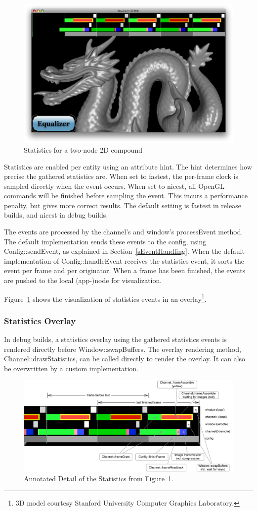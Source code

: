 \documentclass[10pt,a4]{scrartcl}
\newcommand{\fig}[1]{Figure~\ref{#1}}
\newcommand{\sref}[1]{Section~\ref{#1}}
\begin{document}
\begin{figure}
  \includegraphics[width=.382\textwidth]{images/statistics.png}
  {\caption{\small\label{fStatistics}Statistics for a two-node 2D compound}}
\end{figure}
Statistics are enabled per entity using an attribute hint. The hint
determines how precise the gathered statistics are. When set to
\textsf{fastest}, the per-frame clock is sampled directly when the event
occurs. When set to \textsf{nicest}, all OpenGL commands will be
finished before sampling the event. This incurs a performance penalty,
but gives more correct results. The default setting is fastest in
release builds, and nicest in debug builds.

The events are processed by the channel's and window's
\textsf{processEvent} method. The default implementation sends these
events to the config, using \textsf{Config::sendEvent}, as explained in
\sref{sEventHandling}. When the default implementation of
\textsf{Config::handleEvent} receives the statistics event, it sorts the
event per frame and per originator. When a frame has been finished, the
events are pushed to the local (app-)node for visualization.

\fig{fStatistics} shows the visualization of statistics events in an
overlay\footnote{3D model courtesy Stanford University Computer Graphics
  Laboratory.}.

\subsubsection{Statistics Overlay}

In debug builds, a statistics overlay using the gathered statistics
events is rendered directly before \textsf{Window::swapBuffers}. The
overlay rendering method, \textsf{Channel::drawStatistics}, can be
called directly to render the overlay. It can also be overwritten by a
custom implementation.

\begin{figure}[h!t]
  \includegraphics[width=\textwidth]{images/statisticsDetail.pdf}
    {\caption{\small\label{fStatisticsDetail}Annotated Detail of the
        Statistics from \fig{fStatistics}.}}
\end{figure}
\end{document}
